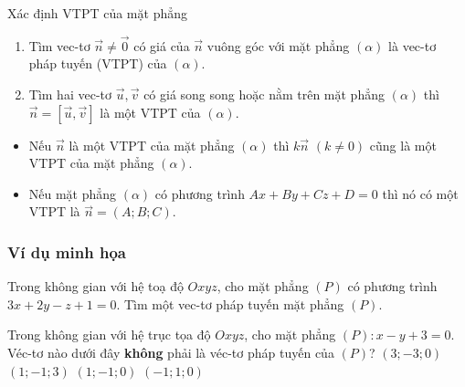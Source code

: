 \begin{dang}{Xác định VTPT của mặt phẳng}
	\begin{enumerate}
		\item Tìm vec-tơ $\overrightarrow{n}\neq \overrightarrow{0}$ có giá của $\overrightarrow{n}$ vuông góc với mặt phẳng $(\alpha)$ là vec-tơ pháp tuyến (VTPT) của $(\alpha)$.
		 \item Tìm hai vec-tơ $\overrightarrow{u},\overrightarrow{v}$ có giá song song hoặc nằm trên mặt phẳng $(\alpha)$ thì $\overrightarrow{n}=\left[\overrightarrow{u},\overrightarrow{v}\right]$ là một VTPT của $(\alpha)$.
		 
	\end{enumerate}
     \begin{note}
     \begin{itemize}
     	\item 	Nếu $\overrightarrow{n}$ là một VTPT của mặt phẳng $(\alpha)$ thì $k\overrightarrow{n}$ $(k\ne 0)$ cũng là một VTPT của mặt phẳng $(\alpha)$.
     	\item Nếu mặt phẳng $(\alpha)$ có phương trình $Ax+By+Cz+D=0$ thì nó có một VTPT là $\overrightarrow{n}=(A;B;C)$.
     	
     \end{itemize}
     \end{note}
	\end{dang}
\setcounter{subsubsection}{0}
\setcounter{vd}{0}
\setcounter{bt}{0}
\setcounter{ex}{0}
\subsubsection{Ví dụ minh họa}
\begin{vd}%
	Trong không gian với hệ toạ độ $Oxyz$, cho mặt phẳng $\left( P \right)$ có phương trình $3x+2y-z+1=0$. Tìm một vec-tơ pháp tuyến mặt phẳng $\left( P \right)$.
\end{vd}
\begin{vd}%
	Trong không gian với hệ trục tọa độ $Oxyz$, cho mặt phẳng $(P)\colon x-y+3=0$. Véc-tơ nào dưới đây \textbf{không} phải là véc-tơ pháp tuyến của $(P)$?
	\choice
	{$(3;-3;0)$}
	{\True $(1;-1;3)$}
	{$(1;-1;0)$}
	{$(-1;1;0)$}
\end{vd}

